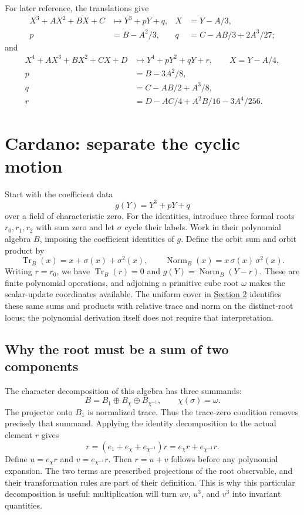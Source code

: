 \documentclass[11pt]{article}
\theoremstyle{remark}
\begin{document}
For later reference, the translations give
\begin{align*}
X^3+AX^2+BX+C&\longmapsto Y^3+pY+q, &X&=Y-A/3,\\
p&=B-A^2/3, &q&=C-AB/3+2A^3/27;
\end{align*}
and
\begin{align*}
X^4+AX^3+BX^2+CX+D&\longmapsto Y^4+pY^2+qY+r,\qquad X=Y-A/4,\\
p&=B-3A^2/8,\\
q&=C-AB/2+A^3/8,\\
r&=D-AC/4+A^2B/16-3A^4/256.
\end{align*}

\section{Cardano: separate the cyclic motion}
\label{cardano:section}

Start with the coefficient data
\[
g(Y)=Y^3+pY+q
\]
over a field of characteristic zero. For the identities, introduce three formal roots \(r_0,r_1,r_2\) with sum zero and let \(\sigma\) cycle their labels. Work in their polynomial algebra \(B\), imposing the coefficient identities of \(g\). Define the orbit sum and orbit product by
\[
\operatorname{Tr}_B(x)=x+\sigma(x)+\sigma^2(x),\qquad
\operatorname{Norm}_B(x)=x\,\sigma(x)\,\sigma^2(x).
\]
Writing \(r=r_0\), we have \(\operatorname{Tr}_B(r)=0\) and \(g(Y)=\operatorname{Norm}_B(Y-r)\). These are finite polynomial operations, and adjoining a primitive cube root \(\omega\) makes the scalar-update coordinates available. The uniform cover in \hyperref[cover:section]{Section 2} identifies these same sums and products with relative trace and norm on the distinct-root locus; the polynomial derivation itself does not require that interpretation.

\subsection{Why the root must be a sum of two components}

The character decomposition of this algebra has three summands:
\[
B=B_1\oplus B_\chi\oplus B_{\chi^{-1}},
\qquad \chi(\sigma)=\omega.
\]
The projector onto \(B_1\) is normalized trace. Thus the trace-zero condition removes precisely that summand. Applying the identity decomposition to the actual element \(r\) gives
\[
r=(e_1+e_\chi+e_{\chi^{-1}})r
  =e_\chi r+e_{\chi^{-1}}r.
\]
Define \(u=e_\chi r\) and \(v=e_{\chi^{-1}}r\). Then \(r=u+v\) follows before any polynomial expansion. The two terms are prescribed projections of the root observable, and their transformation rules are part of their definition. This is why this particular decomposition is useful: multiplication will turn \(uv\), \(u^3\), and \(v^3\) into invariant quantities.
\end{document}
